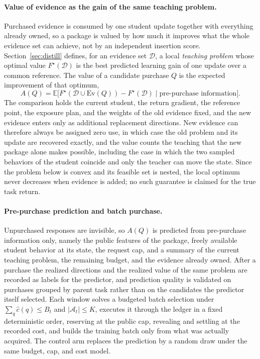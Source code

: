 \paragraph{Value of evidence as the gain of the same teaching problem.}
Purchased evidence is consumed by one student update together with
everything already owned, so a package is valued by how much it
improves what the whole evidence set can achieve, not by an
independent insertion score. Section~\ref{sec:distill} defines, for an
evidence set $\mathcal{D}$, a local \emph{teaching problem} whose
optimal value $F^{\star}(\mathcal{D})$ is the best predicted learning
gain of one update over a common reference. The value of a candidate
purchase $Q$ is the expected improvement of that optimum,
\[
A(Q)=\mathbb{E}\bigl[F^{\star}(\mathcal{D}\cup\mathrm{Ev}(Q))
-F^{\star}(\mathcal{D})\;\big|\;\text{pre-purchase information}\bigr].
\]
The comparison holds the current student, the return gradient, the
reference point, the exposure plan, and the weights of the old
evidence fixed, and the new evidence enters only as additional
replacement directions. New evidence can therefore always be assigned
zero use, in which case the old problem and its update are recovered
exactly, and the value counts the teaching that the new package alone
makes possible, including the case in which the two sampled behaviors
of the student coincide and only the teacher can move the state. Since
the problem below is convex and its feasible set is nested, the local
optimum never decreases when evidence is added; no such guarantee is
claimed for the true task return.

\paragraph{Pre-purchase prediction and batch purchase.}
Unpurchased responses are invisible, so $A(Q)$ is predicted from
pre-purchase information only, namely the public features of the
package, freely available student behavior at its state, the request
cap, and a summary of the current teaching problem, the remaining
budget, and the evidence already owned. After a purchase the realized
directions and the realized value of the same problem are recorded as
labels for the predictor, and prediction quality is validated on
purchases grouped by parent task rather than on the candidates the
predictor itself selected. Each window solves a budgeted batch
selection under $\sum_q\hat c(q)\le B_t$ and $|\mathcal{A}_t|\le K$,
executes it through the ledger in a fixed deterministic order,
reserving at the public cap, revealing and settling at the recorded
cost, and builds the training batch only from what was actually
acquired. The control arm replaces the prediction by a random draw
under the same budget, cap, and cost model.

